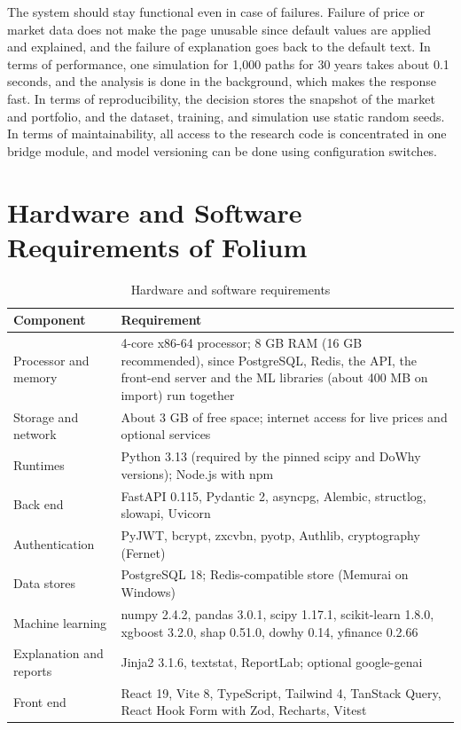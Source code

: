 The system should stay functional even in case of failures. Failure of price or market data does not make the page unusable since default values are applied and explained, and the failure of explanation goes back to the default text. In terms of performance, one simulation for 1,000 paths for 30 years takes about 0.1 seconds, and the analysis is done in the background, which makes the response fast. In terms of reproducibility, the decision stores the snapshot of the market and portfolio, and the dataset, training, and simulation use static random seeds. In terms of maintainability, all access to the research code is concentrated in one bridge module, and model versioning can be done using configuration switches.

\section{Hardware and Software Requirements of Folium}
\begin{table}[H]
\centering
\small
\begin{tabularx}{\textwidth}{|P{3.2cm}|L|}
\hline
\textbf{Component} & \textbf{Requirement} \\
\hline
Processor and memory & 4-core x86-64 processor; 8 GB RAM (16 GB recommended), since PostgreSQL, Redis, the API, the front-end server and the ML libraries (about 400 MB on import) run together \\
\hline
Storage and network & About 3 GB of free space; internet access for live prices and optional services \\
\hline
Runtimes & Python 3.13 (required by the pinned scipy and DoWhy versions); Node.js with npm \\
\hline
Back end & FastAPI 0.115, Pydantic 2, asyncpg, Alembic, structlog, slowapi, Uvicorn \\
\hline
Authentication & PyJWT, bcrypt, zxcvbn, pyotp, Authlib, cryptography (Fernet) \\
\hline
Data stores & PostgreSQL 18; Redis-compatible store (Memurai on Windows) \\
\hline
Machine learning & numpy 2.4.2, pandas 3.0.1, scipy 1.17.1, scikit-learn 1.8.0, xgboost 3.2.0, shap 0.51.0, dowhy 0.14, yfinance 0.2.66 \\
\hline
Explanation and reports & Jinja2 3.1.6, textstat, ReportLab; optional google-genai \\
\hline
Front end & React 19, Vite 8, TypeScript, Tailwind 4, TanStack Query, React Hook Form with Zod, Recharts, Vitest \\
\hline
\end{tabularx}
\caption{Hardware and software requirements}
\label{tab:hwsw}
\end{table}

